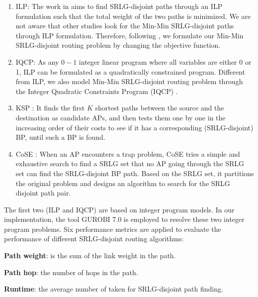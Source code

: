 \begin{enumerate}
  \item ILP: The work in \cite{hu2003diverse}  aims to find SRLG-disjoint paths through an ILP formulation such that the total weight of the two paths is minimized. We are not aware that other studies look for the Min-Min SRLG-disjoint paths through ILP formulation. Therefore, following \cite{hu2003diverse}, we formulate  our Min-Min SRLG-disjoint routing problem by changing the objective function.
  \item IQCP: As any $0-1$ integer linear program where all variables are either 0 or 1,  ILP can be formulated as a quadratically constrained program. Different from ILP, we also model Min-Min SRLG-disjoint routing problem through the Integer Quadratic Constraints Program (IQCP) \cite{hu2003diverse}.
  \item KSP \cite{eppstein1998finding}: It finds the first $K$ shortest paths between the source and the destination as candidate APs, and then tests them one by one in the increasing order of their costs to see if it has a corresponding (SRLG-disjoint) BP, until such a BP is found.
  \item CoSE \cite{rostami2007cose}: When an AP encounters a trap problem, CoSE tries a simple and exhaustive search to find a SRLG set that no AP going through the SRLG set can find the SRLG-disjoint BP path. Based on the SRLG set, it partitions the original problem  and designs an algorithm to search for the SRLG disjoint path pair.
\end{enumerate}
The first two (ILP and IQCP) are based on integer program models. In our implementation, the tool GUROBI 7.0 \cite{optimization2012gurobi} is employed to resolve these two integer program problems.  Six performance metrics are applied to evaluate the performance of different SRLG-disjoint routing algorithms:

\textbf{Path weight}: is the sum of the link weight in the path.

\textbf{Path hop}: the number of hops in the path.

\textbf{Runtime}: the average number of  taken for SRLG-disjoint path finding.

